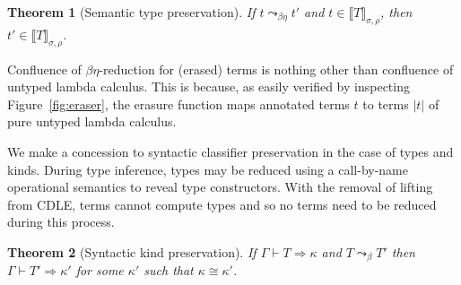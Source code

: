\documentclass{article}
\newcommand{\interp}[1]{\llbracket #1 \rrbracket}
\newcommand{\tpsynth}[0]{\Rightarrow}
\newtheorem{theorem}{Theorem}
\newtheorem{lemma}[theorem]{Lemma}
\begin{document}
\begin{theorem}[Semantic type preservation]
  If $t \leadsto_{\beta\eta} t'$ and $t\in\interp{T}_{\sigma,\rho}$, then $t'\in\interp{T}_{\sigma,\rho}$.
\end{theorem}

  Confluence of $\beta\eta$-reduction for (erased)
  terms is nothing other than confluence of untyped lambda calculus.
  This is because, as easily verified by inspecting
  Figure~\ref{fig:eraser}, the erasure function maps annotated terms
  $t$ to terms $|t|$ of pure untyped lambda calculus.
\begin{comment}
  \begin{lemma}
    If $t$ is an annotated term of CDLE, then $|t|$ is a term of pure untyped lambda calculus.
    \end{lemma}
\end{comment}    

We make a concession to syntactic classifier preservation in the case of types
and kinds.
During type inference, types may be reduced using a call-by-name operational
semantics to reveal type constructors.
With the removal of lifting from CDLE, terms cannot compute types and so no
terms need to be reduced during this process.

\begin{theorem}[Syntactic kind preservation]
  \label{thm:syntactic-kind-pres}
  If \(\Gamma \vdash T \tpsynth \kappa\) and \(T \leadsto_{\beta} T'\) then
  \(\Gamma \vdash T' \tpsynth \kappa'\) for some \(\kappa'\) such that \(\kappa
  \cong \kappa'\).
\end{theorem}
\end{document}
